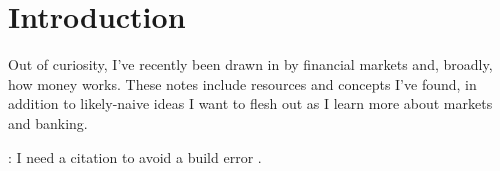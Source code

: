 \section*{Introduction}

Out of curiosity, I've recently been drawn in by financial markets and, broadly, how money works.  These notes include resources and concepts I've found, in addition to likely-naive ideas I want to flesh out as I learn more about markets and banking.

: I need a citation to avoid a build error \cite{Boyd2004}.